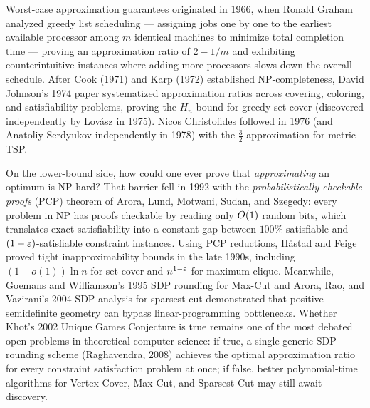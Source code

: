 \begin{historybox}
Worst-case approximation guarantees originated in 1966, when Ronald Graham analyzed greedy list scheduling
--- assigning jobs one by one to the earliest available processor among $m$ identical machines to minimize
total completion time --- proving an approximation ratio of $2 - 1/m$ and exhibiting counterintuitive
instances where adding more processors slows down the overall schedule. After Cook (1971) and Karp (1972)
established \textsf{NP}-completeness, David Johnson's 1974 paper systematized approximation ratios across
covering, coloring, and satisfiability problems, proving the $H_n$ bound for greedy set cover (discovered
independently by Lov\'asz in 1975). Nicos Christofides followed in 1976 (and Anatoliy Serdyukov independently
in 1978) with the $\tfrac32$-approximation for metric TSP.

On the lower-bound side, how could one ever prove that \emph{approximating} an optimum is \textsf{NP}-hard?
That barrier fell in 1992 with the \emph{probabilistically checkable proofs} (PCP) theorem of Arora, Lund,
Motwani, Sudan, and Szegedy: every problem in \textsf{NP} has proofs checkable by reading only $O(1)$
random bits, which translates exact satisfiability into a constant gap between $100\%$-satisfiable and
$(1-\varepsilon)$-satisfiable constraint instances. Using PCP reductions, H\aa stad and Feige proved tight
inapproximability bounds in the late 1990s, including $(1-o(1))\ln n$ for set cover and $n^{1-\varepsilon}$ for
maximum clique. Meanwhile, Goemans and Williamson's 1995 SDP rounding for Max-Cut and Arora, Rao, and
Vazirani's 2004 SDP analysis for sparsest cut demonstrated that positive-semidefinite geometry can bypass
linear-programming bottlenecks. Whether Khot's 2002 Unique Games Conjecture is true remains one of the
most debated open problems in theoretical computer science: if true, a single generic SDP rounding scheme
(Raghavendra, 2008) achieves the optimal approximation ratio for every constraint satisfaction problem at once;
if false, better polynomial-time algorithms for Vertex Cover, Max-Cut, and Sparsest Cut may still await discovery.
\end{historybox}

